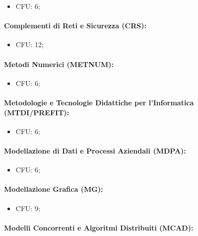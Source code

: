\begin{itemize}
  \item CFU: 6;
\end{itemize}

\paragraph{Complementi di Reti e Sicurezza (CRS):}

\begin{itemize}
  \item CFU: 12;
\end{itemize}

\paragraph{Metodi Numerici (METNUM):}

\begin{itemize}
  \item CFU: 6;
\end{itemize}

\paragraph{Metodologie e Tecnologie Didattiche per l'Informatica (MTDI/PREFIT):}

\begin{itemize}
  \item CFU: 6;
\end{itemize}

\paragraph{Modellazione di Dati e Processi Aziendali (MDPA):}

\begin{itemize}
  \item CFU: 6;
\end{itemize}

\paragraph{Modellazione Grafica (MG):}

\begin{itemize}
  \item CFU: 9;
\end{itemize}

\paragraph{Modelli Concorrenti e Algoritmi Distribuiti (MCAD):}

